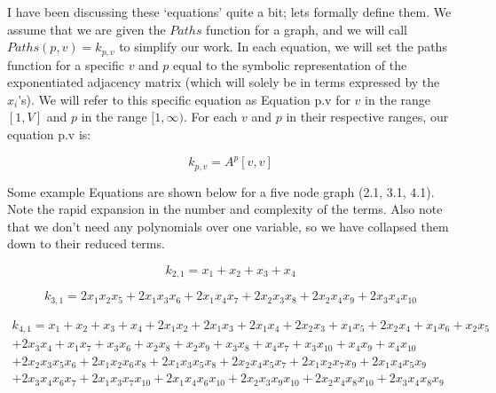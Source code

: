 \documentclass[11pt,a4paper]{report}
\begin{document}
I have been discussing these `equations' quite a bit; lets formally define them.  
We assume that we are given the $Paths$ function for a graph, and we will call $Paths(p, v) = k_{p, v}$ to simplify our work. 
In each equation, we will set the paths function for a specific $v$ and $p$ equal to the symbolic representation of the exponentiated adjacency matrix (which will solely be in terms expressed by the $x_i$'s).
We will refer to this specific equation as Equation p.v for $v$ in the range $[1, V]$ and $p$ in the range $[1, \infty)$.
For each $v$ and $p$ in their respective ranges, our equation p.v is:

$$k_{p, v} = A^p[v,v]$$

Some example Equations are shown below for a five node graph (2.1, 3.1, 4.1). 
Note the rapid expansion in the number and complexity of the terms.  
Also note that we don't need any polynomials over one variable, so we have collapsed them down to their reduced terms.

$$k_{2,1} = x_1 + x_2 + x_3 + x_4$$

$$k_{3,1} = 2x_1x_2x_5 + 2x_1x_3x_6 + 2x_1x_4x_7 + 2x_2x_3x_8 + 2x_2x_4x_9 + 2x_3x_4x_{10}$$

\begin{equation}\begin{aligned} k_{4,1} = x_1 + x_2 + x_3 + x_4 + 2x_1x_2 + 2x_1x_3 + 2x_1x_4 + 2x_2x_3 + x_1x_5 + 2x_2x_4 + x_1x_6 + x_2x_5 \\ + 2x_3x_4 + x_1x_7 + x_3x_6 + x_2x_8 + x_2x_9 + x_3x_8 + x_4x_7 + x_3x_{10} + x_4x_9 + x_4x_{10} \\ + 2x_2x_3x_5x_6 + 2x_1x_2x_6x_8 + 2x_1x_3x_5x_8 + 2x_2x_4x_5x_7 + 2x_1x_2x_7x_9 + 2x_1x_4x_5x_9 \\+ 2x_3x_4x_6x_7 + 2x_1x_3x_7x_{10} + 2x_1x_4x_6x_{10} + 2x_2x_3x_9x_{10} + 2x_2x_4x_8x_{10} + 2x_3x_4x_8x_9 \end{aligned}\end{equation}
\end{document}
